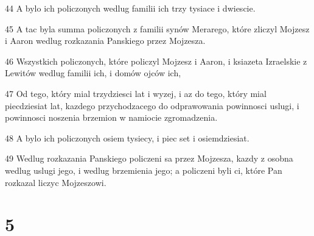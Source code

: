 \par 44 A bylo ich policzonych wedlug familii ich trzy tysiace i dwiescie.
\par 45 A tac byla summa policzonych z familii synów Merarego, które zliczyl Mojzesz i Aaron wedlug rozkazania Panskiego przez Mojzesza.
\par 46 Wszystkich policzonych, które policzyl Mojzesz i Aaron, i ksiazeta Izraelskie z Lewitów wedlug familii ich, i domów ojców ich,
\par 47 Od tego, który mial trzydziesci lat i wyzej, i az do tego, który mial piecdziesiat lat, kazdego przychodzacego do odprawowania powinnosci uslugi, i powinnosci noszenia brzemion w namiocie zgromadzenia.
\par 48 A bylo ich policzonych osiem tysiecy, i piec set i osiemdziesiat.
\par 49 Wedlug rozkazania Panskiego policzeni sa przez Mojzesza, kazdy z osobna wedlug uslugi jego, i wedlug brzemienia jego; a policzeni byli ci, które Pan rozkazal liczyc Mojzeszowi.

\chapter{5}

